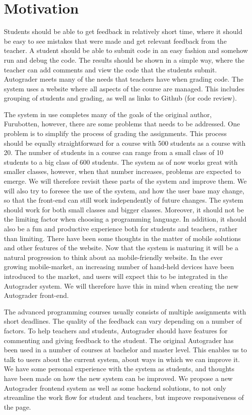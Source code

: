 \chapter*{Motivation}
Students should be able to get feedback in relatively short time, where it should be easy to see mistakes that were made and get relevant feedback from the teacher. A student should be able to submit code in an easy fashion and somehow run and debug the code. The results should be shown in a simple way, where the teacher can add comments and view the code that the students submit. Autograder meets many of the needs that teachers have when grading code. The system uses a website where all aspects of the course are managed. This includes grouping of students and grading, as well as links to Github (for code review).

The system in use completes many of the goals of the original author, Furubotten, however, there are some problems that needs to be addressed. One problem is to simplify the process of grading the assignments. This process should be equally straightforward for a course with 500 students as a course with 20. The number of students in a course can range from a small class of 10 students to a big class of 600 students. The system as of now works great with smaller classes, however, when that number increases, problems are expected to emerge. We will therefore revisit these parts of the system and improve them. We will also try to foresee the use of the system, and how the user base may change, so that the front-end can still work independently of future changes. The system should work for both small classes and bigger classes. Moreover, it should not be the limiting factor when choosing a programming language. In addition, it should also be a fun and productive experience both for students and teachers, rather than limiting. There have been some thoughts in the matter of mobile solutions and other features of the website. Now that the system is maturing it will be a natural progression to think about aa mobile-friendly website. In the ever growing mobile-market, an increasing number of hand-held devices have been introduced to the market, and users will expect this to be integrated in the Autograder system. We will therefore have this in mind when creating the new Autograder front-end.

The advanced programming courses usually consists of multiple assignments with short deadlines. The quality of the feedback can vary depending on a number of factors. To help teachers and students, Autograder should have features for commenting and giving feedback to the student. The original Autograder has been used in a number of courses at bachelor and master level. This enables us to talk to users about the current system, about ways in which we can improve it. We have some personal experience with the system as students, and thoughts have been made on how the new system can be improved. We propose a new Autograder frontend system as well as some backend solutions, to not only streamline the work flow for student and teachers, but improve responsiveness of the page.
